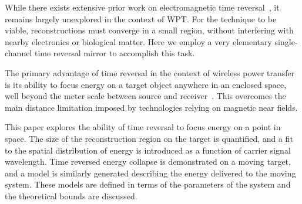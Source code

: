 While there exists extensive prior work on electromagnetic time
reversal~\cite{fink,nltr-wave-chaotic,nltr-classical-waves,tr-green}, it remains
largely unexplored in the context of WPT\@.
%
For the technique to be viable, reconstructions must converge in a small region,
without interfering with nearby electronics or biological matter.
%
Here we employ a very elementary single-channel time reversal mirror to
accomplish this task.



The primary advantage of time reversal in the context of wireless power transfer
is its ability to focus energy on a  target object anywhere in an enclosed space, well
beyond the meter scale between source and
receiver~\cite{fink,nltr-wave-chaotic}.
%
This overcomes the main distance limitation imposed by technologies relying
on magnetic near fields.



This paper explores the ability of time reversal to focus energy on a point in
space.
%
The size of the reconstruction region on the target is quantified, and a fit to
the spatial distribution of energy is introduced as a function of carrier signal
wavelength.
%
Time reversed energy collapse is demonstrated on a moving target, and a model is
similarly generated describing the energy delivered to the moving system.
%
These models are defined in terms of the parameters of the system and the
theoretical bounds are discussed.
